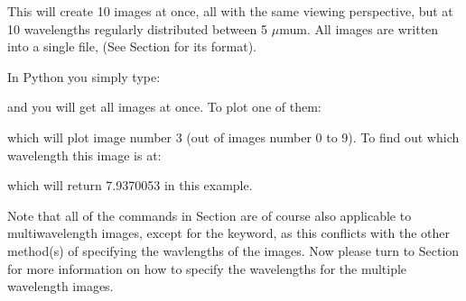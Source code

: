\documentclass[letterpaper,10pt,english]{sphinxmanual}
\begin{document}
\begin{sphinxVerbatim}[commandchars=\\\{\}]
          
\end{sphinxVerbatim}

This will create 10 images at once, all with the same viewing perspective, but
at 10 wavelengths regularly distributed between 5 \(\mu\)mu\textasciigrave{}m.  All images are written into a single file,  (See
Section {\hyperref[\detokenize{inputoutputfiles:sec-image-out}]{}} for its format).

In Python you simply type:

\begin{sphinxVerbatim}[commandchars=\\\{\}]
   
\end{sphinxVerbatim}

and you will get all images at once. To plot one of them:

\begin{sphinxVerbatim}[commandchars=\\\{\}]
\end{sphinxVerbatim}

which will plot image number 3 (out of images number 0 to 9). To find out which
wavelength this image is at:

\begin{sphinxVerbatim}[commandchars=\\\{\}]
\PYG{p}{[}\PYG{p}{]}
\end{sphinxVerbatim}

which will return 7.9370053 in this example.

Note that all of the commands in Section {\hyperref[\detokenize{imagesspectra:sec-images}]{}} are of course also
applicable to multi\sphinxhyphen{}wavelength images, except for the  keyword, as
this conflicts with the other method(s) of specifying the wavlengths of the
images. Now please turn to Section {\hyperref[\detokenize{imagesspectra:sec-set-camera-frequencies}]{}} for more
information on how to specify the wavelengths for the multiple wavelength
images.
\end{document}
